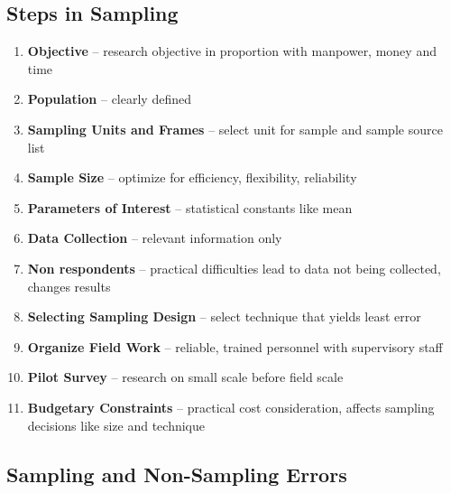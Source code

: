\documentclass{article}
\begin{document}
\subsection{Steps in Sampling}
\begin{enumerate}
    \item \textbf{Objective} -- research objective in proportion with manpower, money and time
    \item \textbf{Population} -- clearly defined
    \item \textbf{Sampling Units and Frames} --  select unit for sample and sample source list
    \item \textbf{Sample Size} -- optimize for efficiency, flexibility, reliability
    \item \textbf{Parameters of Interest} -- statistical constants like mean
    \item \textbf{Data Collection} -- relevant information only
    \item \textbf{Non respondents} -- practical difficulties lead to data not being collected, changes results
    \item \textbf{Selecting Sampling Design} -- select technique that yields least error
    \item \textbf{Organize Field Work} -- reliable, trained personnel with supervisory staff
    \item \textbf{Pilot Survey} -- research on small scale before field scale
    \item \textbf{Budgetary Constraints} -- practical cost consideration, affects sampling decisions like size and technique
\end{enumerate}

\subsection{Sampling and Non-Sampling Errors}
\pagebreak
\end{document}
